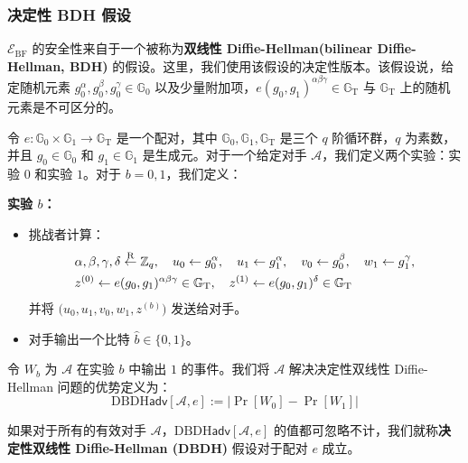 \subsubsection{决定性 BDH 假设}\label{subsubsec:15-6-3-2}

$\mathcal{E}_\mathrm{BF}$ 的安全性来自于一个被称为\textbf{双线性 Diffie-Hellman(bilinear Diffie-Hellman, BDH)} 的假设。这里，我们使用该假设的决定性版本。该假设说，给定随机元素 $g_0^\alpha,g_0^\beta,g_0^\gamma\in\mathbb{G}_0$ 以及少量附加项，$e(g_0,g_1)^{\alpha\beta\gamma}\in\mathbb{G}_\mathrm{T}$ 与 $\mathbb{G}_\mathrm{T}$ 上的随机元素是不可区分的。

\begin{game}\label{game:15-7}
令 $e:\mathbb{G}_0\times\mathbb{G}_1\to\mathbb{G}_\mathrm{T}$ 是一个配对，其中 $\mathbb{G}_0,\mathbb{G}_1,\mathbb{G}_\mathrm{T}$ 是三个 $q$ 阶循环群，$q$ 为素数，并且 $g_0\in\mathbb{G}_0$ 和 $g_1\in\mathbb{G}_1$ 是生成元。对于一个给定对手 $\mathcal{A}$，我们定义两个实验：实验 $0$ 和实验 $1$。对于 $b=0,1$，我们定义：

\vspace{5pt}

\textbf{实验 $b$：}
\begin{itemize}
	\item 挑战者计算：
	\[
		\begin{aligned}
			& \alpha,\beta,\gamma,\delta\overset{\rm R}\leftarrow\mathbb{Z}_q,\quad
			u_0\leftarrow g_0^\alpha,\quad
			u_1\leftarrow g_1^\alpha,\quad
			v_0\leftarrow g_0^\beta,\quad
			w_1\leftarrow g_1^\gamma,\\
			& z^{(0)}\leftarrow e(g_0,g_1)^{\alpha\beta\gamma}\in\mathbb{G}_\mathrm{T},\quad
			z^{(1)}\leftarrow e(g_0,g_1)^{\delta}\in\mathbb{G}_\mathrm{T}
		\end{aligned}
	\]
	并将 $\big(u_0,u_1,v_0,w_1,z^{(b)}\big)$ 发送给对手。
	\item 对手输出一个比特 $\hat{b}\in\{0,1\}$。
\end{itemize}
令 $W_b$ 为 $\mathcal{A}$ 在实验 $b$ 中输出 $1$ 的事件。我们将 $\mathcal{A}$ 解决决定性双线性 Diffie-Hellman 问题的优势定义为：
\[
\mathrm{DBDH}\mathsf{adv}[\mathcal{A},e]
:=
\big\lvert
\Pr[W_0]-\Pr[W_1]
\big\rvert
\]
\end{game}

\begin{definition}\label{def:15-11}
如果对于所有的有效对手 $\mathcal{A}$，$\mathrm{DBDH}\mathsf{adv}[\mathcal{A},e]$ 的值都可忽略不计，我们就称\textbf{决定性双线性 Diffie-Hellman (DBDH)} 假设对于配对 $e$ 成立。
\end{definition}

